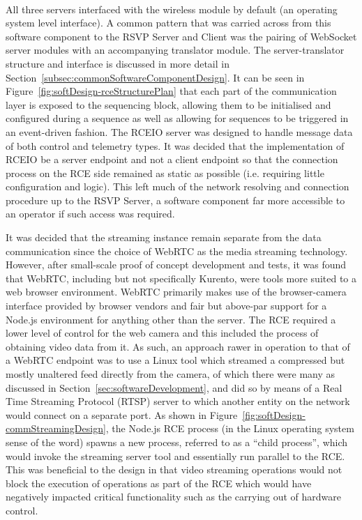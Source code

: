          
        \\\\
        
        \\\\
          
          
         \\\\
           All three servers interfaced with the wireless module by default (an operating system level interface). A common pattern that was carried across from this software component to the RSVP Server and Client was the pairing of WebSocket server modules with an accompanying translator module. The server-translator structure and interface is discussed in more detail in Section~\ref{subsec:commonSoftwareComponentDesign}. It can be seen in Figure~\ref{fig:softDesign-rceStructurePlan} that each part of the communication layer is exposed to the sequencing block, allowing them to be initialised and configured during a sequence as well as allowing for sequences to be triggered in an event-driven fashion. The RCEIO server was designed to handle message data of both control and telemetry types. It was decided that the implementation of RCEIO be a server endpoint and not a client endpoint so that the connection process on the RCE side remained as static as possible (i.e. requiring little configuration and logic). This left much of the network resolving and connection procedure up to the RSVP Server, a software component far more accessible to an operator if such access was required.
           
           It was decided that the streaming instance remain separate from the data communication since the choice of WebRTC as the media streaming technology. However, after small-scale proof of concept development and tests, it was found that WebRTC, including but not specifically Kurento, were tools more suited to a web browser environment. WebRTC primarily makes use of the browser-camera interface provided by browser vendors and fair but above-par support for a Node.js environment for anything other than the server. The RCE required a lower level of control for the web camera and this included the process of obtaining video data from it. As such, an approach rawer in operation to that of a WebRTC endpoint was to use a Linux tool which streamed a compressed but mostly unaltered feed directly from the camera, of which there were many as discussed in Section~\ref{sec:softwareDevelopment}, and did so by means of a Real Time Streaming Protocol (RTSP) server to which another entity on the network would connect on a separate port. As shown in Figure~\ref{fig:softDesign-commStreamingDesign}, the Node.js RCE process (in the Linux operating system sense of the word) spawns a new process, referred to as a ``child process'', which would invoke the streaming server tool and essentially run parallel to the RCE. This was beneficial to the design in that video streaming operations would not block the execution of operations as part of the RCE which would have negatively impacted critical functionality such as the carrying out of hardware control.
           
